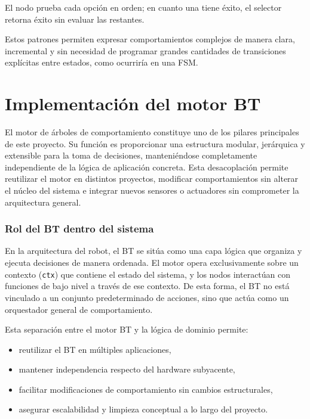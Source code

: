 \documentclass{prgrado}
\begin{document}
El nodo prueba cada opción en orden; en cuanto una tiene éxito, el selector retorna éxito sin evaluar las restantes.

Estos patrones permiten expresar comportamientos complejos de manera clara, incremental y sin necesidad de programar grandes cantidades de transiciones explícitas entre estados, como ocurriría en una FSM.


\section{Implementación del motor BT}

El motor de árboles de comportamiento constituye uno de los pilares principales de este proyecto. Su función es proporcionar una estructura modular, jerárquica y extensible para la toma de decisiones, manteniéndose completamente independiente de la lógica de aplicación concreta. Esta desacoplación permite reutilizar el motor en distintos proyectos, modificar comportamientos sin alterar el núcleo del sistema e integrar nuevos sensores o actuadores sin comprometer la arquitectura general.

\subsubsection{Rol del BT dentro del sistema}

En la arquitectura del robot, el BT se sitúa como una capa lógica que organiza y ejecuta decisiones de manera ordenada. El motor opera exclusivamente sobre un contexto (\texttt{ctx}) que contiene el estado del sistema, y los nodos interactúan con funciones de bajo nivel a través de ese contexto. De esta forma, el BT no está vinculado a un conjunto predeterminado de acciones, sino que actúa como un orquestador general de comportamiento.

Esta separación entre el motor BT y la lógica de dominio permite:

\begin{itemize}
    \item reutilizar el BT en múltiples aplicaciones,
    \item mantener independencia respecto del hardware subyacente,
    \item facilitar modificaciones de comportamiento sin cambios estructurales,
    \item asegurar escalabilidad y limpieza conceptual a lo largo del proyecto.
\end{itemize}
\end{document}
